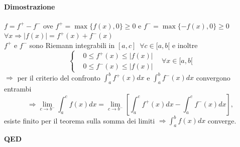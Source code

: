 \documentclass{article}
\begin{document}
\paragraph{{Dimostrazione}}
$f=f^+-f^-$ ove $f^+=\max\{f(x),0\} \geq 0$ e $f^-=\max\{-f(x),0\} \geq 0$ $\forall x \Rightarrow |f(x)|=f^+(x)+f^-(x)$\\
$f^+$ e $f^-$ sono Riemann integrabili  in  $[a,c]\,\,\, \forall c\in [a,b[$ e inoltre
\begin{equation*}
\begin{cases}
    & 0 \leq f^+(x) \leq |f(x)|\\
    & 0 \leq f^-(x) \leq |f(x)|
\end{cases}
 \,\,\,\,\, \forall x \in [a,b[
\end{equation*}
$\Rightarrow$ per il criterio del confronto $\int_{a}^{b} f^+(x)dx$ e $\int_{a}^{b} f^-(x)dx$ convergono entrambi 
\begin{equation*}
    \Rightarrow \lim_{c \rightarrow b^-} \int_{a}^{c} f(x)dx = \lim_{c \rightarrow b^-} \left[ \int_{a}^{c}f^+(x)dx - \int_{a}^{c}f^-(x)dx \right],
\end{equation*}
esiste finito per il teorema sulla somma dei limiti $\Rightarrow \int_{a}^{b} f(x) dx$ converge.
\begin{flushright}
\textbf{QED}
\end{flushright}
\end{document}
